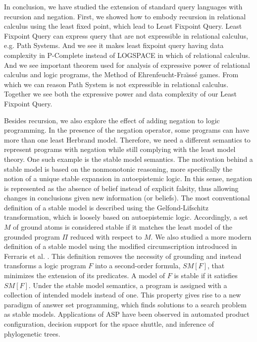 In conclusion, we have studied the extension of standard query languages with recursion and negation. First, we showed how to embody recursion in relational calculus using the least fixed point, which lead to Least Fixpoint Query. Least Fixpoint Query can express query that are not expressible in relational calculus, e.g.  Path Systems. And we see it makes least fixpoint query having data complexity in P-Complete instead of LOGSPACE in which of relational calculus. And we see important theorem used for analysis of expressive power of relational calculus and logic programs, the Method of Ehrenfeucht-Fra\"ıss\'e games. From which we can reason Path System is not expressible in relational calculus. Together we see both the expressive power and data complexity of our Least Fixpoint Query. 

Besides recursion, we also explore the effect of adding negation 
to logic programming. In the presence of the negation operator, 
some programs can have more than one least Herbrand model. Therefore, 
we need a different semantics to represent programs with negation 
while still complying with the least model theory. One such 
example is the stable model semantics. The motivation behind 
a stable model is based on the nonmonotonic reasoning, more 
specifically the notion of a unique stable expansion in 
autoepistemic logic. In this sense, negation is represented as 
the absence of belief instead of explicit falsity, thus allowing 
changes in conclusions given new information (or beliefs). The 
most conventional definition of a stable model is described 
using the Gelfond-Lifschitz transformation, which is loosely based on 
autoepistemic logic. Accordingly, a set $M$ of ground atoms is considered 
stable if it matches the least model of the grounded program $\Pi$ reduced 
with respect to $M$. We also studied a more modern definition of a stable 
model using the modified circumscription introduced in Ferraris et al. \cite{lee}. 
This definition removes the necessity of grounding and instead transforms 
a logic program $F$ into a second-order formula, $SM[F]$, that minimizes the extension of 
its predicates. A model of $F$ is stable if it satisfies $SM[F]$. 
Under the stable model semantics, a program is assigned with a 
collection of intended models instead of one. This property 
gives rise to a new paradigm of answer set programming, 
which finds solutions to a search problem as stable models. Applications 
of ASP have been observed in automated product configuration, decision 
support for the space shuttle, and inference of phylogenetic trees.

